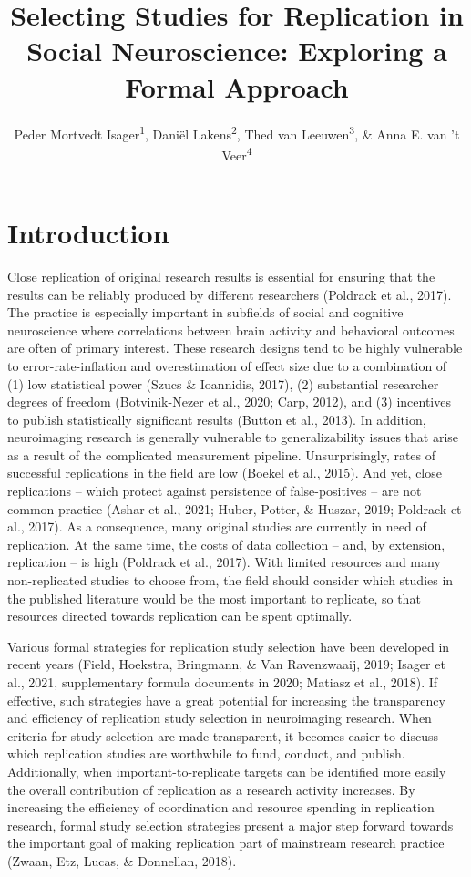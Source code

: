 \documentclass[
  english,
  man,floatsintext]{apa6}
\title{Selecting Studies for Replication in Social Neuroscience: Exploring a Formal Approach}
\author{Peder Mortvedt Isager\textsuperscript{1}, Daniël Lakens\textsuperscript{2}, Thed van Leeuwen\textsuperscript{3}, \& Anna E. van 't Veer\textsuperscript{4}}
\date{}
\affiliation{\vspace{0.5cm}\textsuperscript{1} Department of Psychology, Oslo New University College\\\textsuperscript{2} Department of Industrial Engineering \& Innovation Sciences, Eindhoven University of Technology\\\textsuperscript{3} Centre for Science and Technology Studies, Leiden University\\\textsuperscript{4} Methodology and Statistics unit, Institute of Psychology, Leiden University}
\begin{document}
\maketitle

\hypertarget{introduction}{%
\section{Introduction}\label{introduction}}

Close replication of original research results is essential for ensuring that the results can be reliably produced by different researchers (Poldrack et al., 2017). The practice is especially important in subfields of social and cognitive neuroscience where correlations between brain activity and behavioral outcomes are often of primary interest. These research designs tend to be highly vulnerable to error-rate-inflation and overestimation of effect size due to a combination of (1) low statistical power (Szucs \& Ioannidis, 2017), (2) substantial researcher degrees of freedom (Botvinik-Nezer et al., 2020; Carp, 2012), and (3) incentives to publish statistically significant results (Button et al., 2013). In addition, neuroimaging research is generally vulnerable to generalizability issues that arise as a result of the complicated measurement pipeline. Unsurprisingly, rates of successful replications in the field are low (Boekel et al., 2015). And yet, close replications -- which protect against persistence of false-positives -- are not common practice (Ashar et al., 2021; Huber, Potter, \& Huszar, 2019; Poldrack et al., 2017). As a consequence, many original studies are currently in need of replication. At the same time, the costs of data collection -- and, by extension, replication -- is high (Poldrack et al., 2017). With limited resources and many non-replicated studies to choose from, the field should consider which studies in the published literature would be the most important to replicate, so that resources directed towards replication can be spent optimally.

Various formal strategies for replication study selection have been developed in recent years (Field, Hoekstra, Bringmann, \& Van Ravenzwaaij, 2019; Isager et al., 2021, supplementary formula documents in 2020; Matiasz et al., 2018). If effective, such strategies have a great potential for increasing the transparency and efficiency of replication study selection in neuroimaging research. When criteria for study selection are made transparent, it becomes easier to discuss which replication studies are worthwhile to fund, conduct, and publish. Additionally, when important-to-replicate targets can be identified more easily the overall contribution of replication as a research activity increases. By increasing the efficiency of coordination and resource spending in replication research, formal study selection strategies present a major step forward towards the important goal of making replication part of mainstream research practice (Zwaan, Etz, Lucas, \& Donnellan, 2018).
\end{document}
